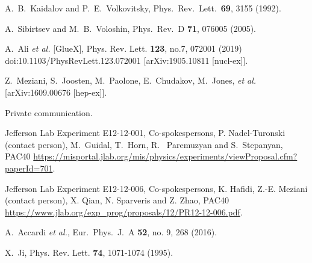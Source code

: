 \documentclass[prd,amsmath,%
twocolumn,floatfix,amssymb, preprintnumbers, linenumbers,nofootinbib, superscriptaddress]{revtex4}
\begin{document}
\begin{thebibliography}{99}
  A.~B.~Kaidalov and P.~E.~Volkovitsky,
  Phys.\ Rev.\ Lett.\  {\bf 69}, 3155 (1992).


  A.~Sibirtsev and M.~B.~Voloshin,
  Phys.\ Rev.\ D {\bf 71}, 076005 (2005).


A.~Ali \textit{et al.} [GlueX],
Phys. Rev. Lett. \textbf{123}, no.7, 072001 (2019)
doi:10.1103/PhysRevLett.123.072001
[arXiv:1905.10811 [nucl-ex]].

Z.~Meziani, S.~Joosten, M.~Paolone, E.~Chudakov, M.~Jones, {\it et al.}
[arXiv:1609.00676 [hep-ex]].

Private communication.

Jefferson Lab Experiment E12-12-001, Co-spokespersons, P. Nadel-Turonski (contact person),  M.~Guidal, T.~Horn, R. ~Paremuzyan and S.~Stepanyan, PAC40 \url{https://misportal.jlab.org/mis/physics/experiments/viewProposal.cfm?paperId=701}.

Jefferson Lab Experiment E12-12-006, Co-spokespersons, K. Hafidi, Z.-E. Meziani (contact person), X. Qian, N. Sparveris and Z. Zhao, PAC40 \url{https://www.jlab.org/exp_prog/proposals/12/PR12-12-006.pdf}.

  A.~Accardi {\it et al.},
  Eur.\ Phys.\ J.\ A {\bf 52}, no. 9, 268 (2016).

X.~Ji,
Phys. Rev. Lett. \textbf{74}, 1071-1074 (1995). 


\end{thebibliography}
\end{document}
